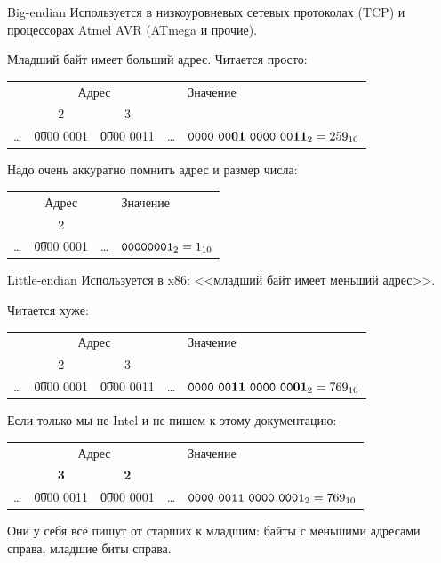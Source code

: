 \begin{frame}{Big-endian}
	Используется в низкоуровневых сетевых протоколах (TCP) и процессорах Atmel AVR (ATmega и прочие).

	Младший байт имеет больший адрес.
	Читается просто:
	\begin{center}
		\begin{tabular}{|c|c|c|c|l|}
			\hline
			\multicolumn{4}{|c|}{Адрес} & Значение \\
			& 2 & 3 & & \\\hline
			\dots & \t{0000 0001} & \t{0000 0011} & \dots & $\t{0000~00\textbf{01}~0000~00\textbf{11}}_2=259_{10}$ \\
			\hline
		\end{tabular}
	\end{center}

	Надо очень аккуратно помнить адрес и размер числа:
	\begin{center}
		\begin{tabular}{|c|c|c|l|}
			\hline
			\multicolumn{3}{|c|}{Адрес} & Значение \\
			& 2 & & \\\hline
			\dots & \t{0000 0001} & \dots & $\t{0000 0001}_2=1_{10}$ \\
			\hline
		\end{tabular}
	\end{center}
\end{frame}

\begin{frame}{Little-endian}
	Используется в x86: <<младший байт имеет меньший адрес>>.

	Читается хуже:
	\begin{center}
		\begin{tabular}{|c|c|c|c|l|}
			\hline
			\multicolumn{4}{|c|}{Адрес} & Значение \\
			& 2 & 3 & & \\\hline
			\dots & \t{0000 0001} & \t{0000 0011} & \dots & $\t{0000~00\textbf{11}~0000~00\textbf{01}}_2=769_{10}$ \\
			\hline
		\end{tabular}
	\end{center}
	Если только мы не Intel и не пишем к этому документацию:
	\begin{center}
		\begin{tabular}{|c|c|c|c|l|}
			\hline
			\multicolumn{4}{|c|}{Адрес} & Значение \\
			& \textbf{3} & \textbf{2} & & \\\hline
			\dots & \t{0000 0011} & \t{0000 0001} & \dots & $\t{0000~0011~0000~0001}_2=769_{10}$ \\
			\hline
		\end{tabular}
	\end{center}
	Они у себя всё пишут от старших к младшим: байты с меньшими адресами справа, младшие биты справа.
\end{frame}

